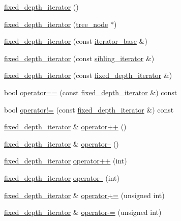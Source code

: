 \begin{CompactItemize}
\item 
\hyperlink{classtree_1_1fixed__depth__iterator_10f1d20ec2b62e4370a560ebcd84ad54}{fixed\_\-depth\_\-iterator} ()
\item 
\hyperlink{classtree_1_1fixed__depth__iterator_a9c0c41473a4d70efa17d7906829823c}{fixed\_\-depth\_\-iterator} (\hyperlink{classtree__node__}{tree\_\-node} $\ast$)
\item 
\hyperlink{classtree_1_1fixed__depth__iterator_64403be9e04a8e4929531b8e227b5d94}{fixed\_\-depth\_\-iterator} (const \hyperlink{classtree_1_1iterator__base}{iterator\_\-base} \&)
\item 
\hyperlink{classtree_1_1fixed__depth__iterator_949317e3e8a986e72e0a8dbb79a00b03}{fixed\_\-depth\_\-iterator} (const \hyperlink{classtree_1_1sibling__iterator}{sibling\_\-iterator} \&)
\item 
\hyperlink{classtree_1_1fixed__depth__iterator_4416f43946317c249652270fec7c84a6}{fixed\_\-depth\_\-iterator} (const \hyperlink{classtree_1_1fixed__depth__iterator}{fixed\_\-depth\_\-iterator} \&)
\item 
bool \hyperlink{classtree_1_1fixed__depth__iterator_cb39be8cb92b1acd5aca197ad6df179b}{operator==} (const \hyperlink{classtree_1_1fixed__depth__iterator}{fixed\_\-depth\_\-iterator} \&) const 
\item 
bool \hyperlink{classtree_1_1fixed__depth__iterator_978b6d94930a7a6e4f3464fa24e502b8}{operator!=} (const \hyperlink{classtree_1_1fixed__depth__iterator}{fixed\_\-depth\_\-iterator} \&) const 
\item 
\hyperlink{classtree_1_1fixed__depth__iterator}{fixed\_\-depth\_\-iterator} \& \hyperlink{classtree_1_1fixed__depth__iterator_71bcee62caa033974d5c0d94ab0dc0c6}{operator++} ()
\item 
\hyperlink{classtree_1_1fixed__depth__iterator}{fixed\_\-depth\_\-iterator} \& \hyperlink{classtree_1_1fixed__depth__iterator_39a2c5b5048ec0dfff33fbb55bd7767e}{operator--} ()
\item 
\hyperlink{classtree_1_1fixed__depth__iterator}{fixed\_\-depth\_\-iterator} \hyperlink{classtree_1_1fixed__depth__iterator_f1a1bf2404498a385611f938c2d6a750}{operator++} (int)
\item 
\hyperlink{classtree_1_1fixed__depth__iterator}{fixed\_\-depth\_\-iterator} \hyperlink{classtree_1_1fixed__depth__iterator_b404acdf3639ea5e5ce2ae65b77b94c7}{operator--} (int)
\item 
\hyperlink{classtree_1_1fixed__depth__iterator}{fixed\_\-depth\_\-iterator} \& \hyperlink{classtree_1_1fixed__depth__iterator_6909c400794c6feb49d75b99dbf6aa00}{operator+=} (unsigned int)
\item 
\hyperlink{classtree_1_1fixed__depth__iterator}{fixed\_\-depth\_\-iterator} \& \hyperlink{classtree_1_1fixed__depth__iterator_e8ccf119ae29e96044d9a4eeca2a539d}{operator-=} (unsigned int)
\end{CompactItemize}
